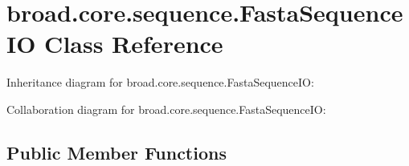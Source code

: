 \hypertarget{classbroad_1_1core_1_1sequence_1_1_fasta_sequence_i_o}{\section{broad.\+core.\+sequence.\+Fasta\+Sequence\+I\+O Class Reference}
\label{classbroad_1_1core_1_1sequence_1_1_fasta_sequence_i_o}
}


Inheritance diagram for broad.\+core.\+sequence.\+Fasta\+Sequence\+I\+O\+:


Collaboration diagram for broad.\+core.\+sequence.\+Fasta\+Sequence\+I\+O\+:
\subsection*{Public Member Functions}
